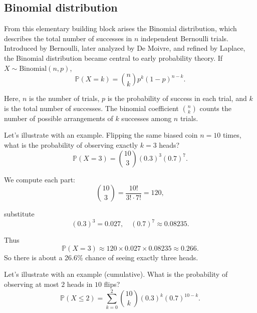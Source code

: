 \documentclass{book}
\begin{document}
\subsection*{Binomial distribution}

From this elementary building block arises the Binomial distribution, which describes the total number of successes in $n$ independent Bernoulli trials. Introduced by Bernoulli, later analyzed by De Moivre, and refined by Laplace, the Binomial distribution became central to early probability theory. If $X \sim \text{Binomial}(n, p)$,
\begin{equation}
	\mathbb{P}(X = k) = \binom{n}{k} p^k (1 - p)^{n - k}.
	\label{eq:binomial1}
\end{equation}

Here, $n$ is the number of trials, $p$ is the probability of success in each trial, and $k$ is the total number of successes. The binomial coefficient $\binom{n}{k}$ counts the number of possible arrangements of $k$ successes among $n$ trials.

\medskip

Let's illustrate with an example. Flipping the same biased coin $n=10$ times, what is the probability of observing exactly $k=3$ heads?
\begin{equation}
	\mathbb{P}(X=3) = \binom{10}{3} (0.3)^3 (0.7)^7.
\end{equation}

We compute each part:
\begin{equation}
	\binom{10}{3} = \frac{10!}{3! \cdot 7!} = 120,
\end{equation}

substitute
\begin{equation}
	(0.3)^3 = 0.027, \quad (0.7)^7 \approx 0.08235.
\end{equation}

Thus
\begin{equation}
	\mathbb{P}(X=3) \approx 120 \times 0.027 \times 0.08235 \approx 0.266.
\end{equation}
So there is about a 26.6\% chance of seeing exactly three heads.

\medskip

Let's illustrate with an example (cumulative). What is the probability of observing at most $2$ heads in $10$ flips?
\begin{equation}
	\mathbb{P}(X \leq 2) = \sum_{k=0}^2 \binom{10}{k} (0.3)^k (0.7)^{10-k}.
\end{equation}
\end{document}
